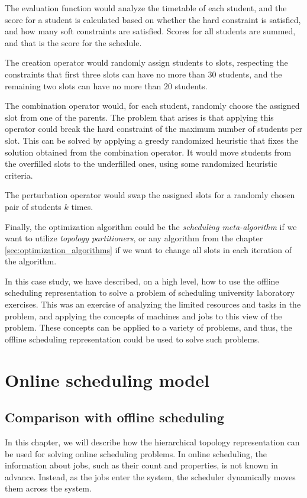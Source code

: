 The evaluation function would analyze the timetable of each student, and the score for a student is calculated based on whether the hard constraint is satisfied, and how many soft constraints are satisfied. Scores for all students are summed, and that is the score for the schedule.

The creation operator would randomly assign students to slots, respecting the constraints that first three slots can have no more than $30$ students, and the remaining two slots can have no more than $20$ students.

The combination operator would, for each student, randomly choose the assigned slot from one of the parents. The problem that arises is that applying this operator could break the hard constraint of the maximum number of students per slot. This can be solved by applying a greedy randomized heuristic that fixes the solution obtained from the combination operator. It would move students from the overfilled slots to the underfilled ones, using some randomized heuristic criteria.

The perturbation operator would swap the assigned slots for a randomly chosen pair of students $k$ times.

Finally, the optimization algorithm could be the \textit{scheduling meta-algorithm} if we want to utilize \textit{topology partitioners}, or any algorithm from the chapter \ref{sec:optimization_algorithms} if we want to change all slots in each iteration of the algorithm. 

In this case study, we have described, on a high level, how to use the offline scheduling representation to solve a problem of scheduling university laboratory exercises. This was an exercise of analyzing the limited resources and tasks in the problem, and applying the concepts of machines and jobs to this view of the problem. These concepts can be applied to a variety of problems, and thus, the offline scheduling representation could be used to solve such problems.

\chapter{Online scheduling model}
\label{sec:online_scheduling_model}

\section{Comparison with offline scheduling}

In this chapter, we will describe how the hierarchical topology representation can be used for solving online scheduling problems. In online scheduling, the information about jobs, such as their count and properties, is not known in advance. Instead, as the jobs enter the system, the scheduler dynamically moves them across the system.

